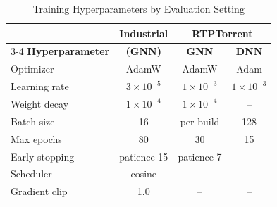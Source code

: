\documentclass[10pt,journal,compsoc]{IEEEtran}
\begin{document}
\begin{table}[!t]
\centering
\caption{Training Hyperparameters by Evaluation Setting}
\label{tab:hyperparams}
\footnotesize
\begin{tabular}{lccc}
\toprule
 & \textbf{Industrial} & \multicolumn{2}{c}{\textbf{RTPTorrent}} \\
\cmidrule(lr){3-4}
\textbf{Hyperparameter} & \textbf{(GNN)} & \textbf{GNN} & \textbf{DNN} \\
\midrule
Optimizer & AdamW & AdamW & Adam \\
Learning rate & $3 \times 10^{-5}$ & $1 \times 10^{-3}$ & $1 \times 10^{-3}$ \\
Weight decay & $1 \times 10^{-4}$ & $1 \times 10^{-4}$ & -- \\
Batch size & 16 & per-build & 128 \\
Max epochs & 80 & 30 & 15 \\
Early stopping & patience 15 & patience 7 & -- \\
Scheduler & cosine & -- & -- \\
Gradient clip & 1.0 & -- & -- \\
\bottomrule
\end{tabular}
\end{table}
\end{document}
